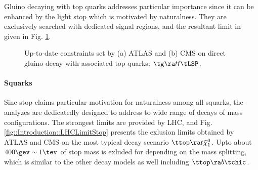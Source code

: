 Gluino decaying with top quarks addresses particular importance since it can be enhanced by the light stop which is motivated by naturalness. They are exclusively searched with dedicated signal regions, and the resultant limit in given in Fig. \ref{fig::Introduction::LHCLimitGtt}.

\begin{figure}[h]
  \centering
    \caption{Up-to-date constraints set by (a) ATLAS and (b) CMS on direct gluino decay with associated top quarks: $\tg \ra t\bar{t} \tLSP$.}
    \label{fig::Introduction::LHCLimitGtt}
\end{figure}


\paragraph{Squarks}
Sine stop claims particular motivation for naturalness among all squarks, 
the analyzes are dedicatedly designed to address to wide range of decays of mass configurations.
The strongest limits are provided by LHC, and Fig. \ref{fig::Introduction::LHCLimitStop} presents the exlusion limits obtained by ATLAS and CMS on the most typical decay scenario $\ttop \ra t \tilde{\chi}_1^0$.
Upto about $400\gev \sim 1\tev$ of stop mass is exluded for depending on the mass splitting, which is similar to the other decay models as well including $\ttop \ra b \tchic$.

